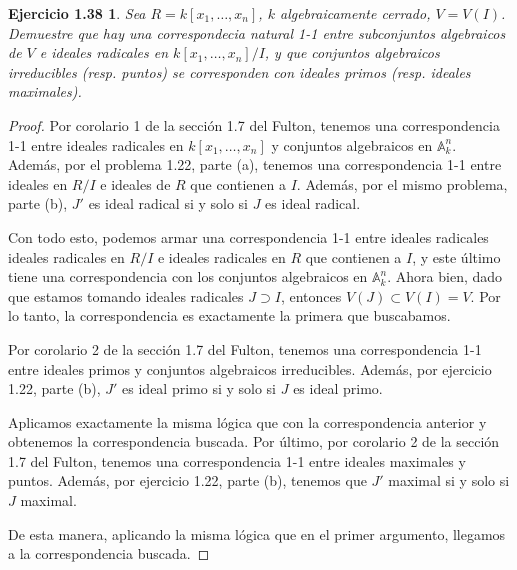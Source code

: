 \documentclass{amsart}
\theoremstyle{plain}
\newtheorem*{ejercicio5}{Ejercicio 1.38}
\begin{document}
	\begin{ejercicio5}
		Sea $R = k[x_{1},\dots,x_{n}]$, $k$ algebraicamente cerrado, $V = V(I)$. Demuestre que hay una correspondecia natural 1-1 entre subconjuntos algebraicos de $V$ e ideales radicales en $k[x_{1},\dots,x_{n}] \slash I$, y que conjuntos algebraicos irreducibles (resp. puntos) se corresponden con ideales primos (resp. ideales maximales).
	\end{ejercicio5}
	\begin{proof}
		Por corolario 1 de la sección 1.7 del Fulton, tenemos una correspondencia 1-1 entre ideales radicales en $k[x_{1},\dots,x_{n}]$ y conjuntos algebraicos en $\mathbb{A}^{n}_{k}$. Además, por el problema 1.22, parte (a), tenemos una correspondencia 1-1 entre ideales en $R \slash I$ e ideales de $R$ que contienen a $I$. Además, por el mismo problema, parte (b), $J'$ es ideal radical si y solo si $J$ es ideal radical. \par
		Con todo esto, podemos armar una correspondencia 1-1 entre ideales radicales ideales radicales en $R \slash I$ e ideales radicales en $R$ que contienen a $I$, y este último tiene una correspondencia con los conjuntos algebraicos en $\mathbb{A}^{n}_{k}$. Ahora bien, dado que estamos tomando ideales radicales $J \supset I$, entonces $V(J) \subset V(I) = V$. Por lo tanto, la correspondencia es exactamente la primera que buscabamos. \par
		Por corolario 2 de la sección 1.7 del Fulton, tenemos una correspondencia 1-1 entre ideales primos y conjuntos algebraicos irreducibles. Además, por ejercicio 1.22, parte (b), $J'$ es ideal primo si y solo si $J$ es ideal primo. \par
		Aplicamos exactamente la misma lógica que con la correspondencia anterior y obtenemos la correspondencia buscada.
		Por último, por corolario 2 de la sección 1.7 del Fulton, tenemos una correspondencia 1-1 entre ideales maximales y puntos. Además, por ejercicio 1.22, parte (b), tenemos que $J'$ maximal si y solo si $J$ maximal. \par
		De esta manera, aplicando la misma lógica que en el primer argumento, llegamos a la correspondencia buscada.
	\end{proof}
\end{document}
